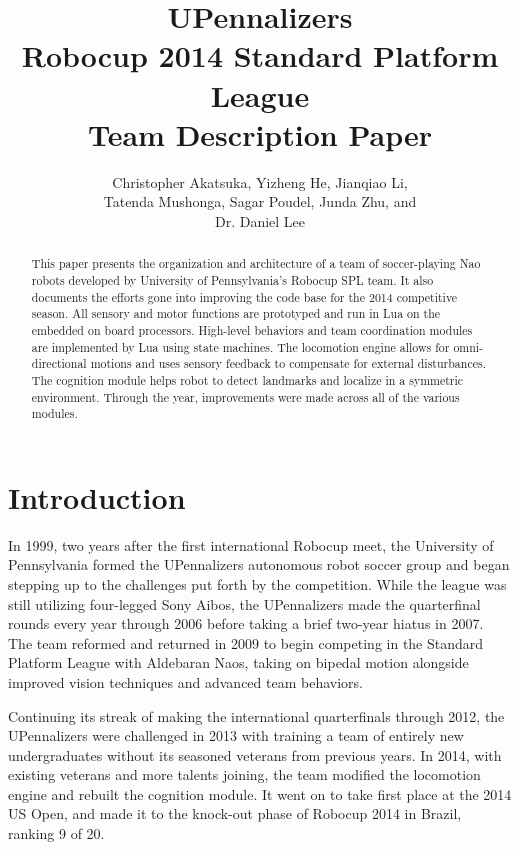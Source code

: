 \documentclass{article}
\title{UPennalizers \\Robocup 2014 Standard Platform League \\Team Description Paper}
\author{Christopher Akatsuka, Yizheng He, Jianqiao Li,\\ Tatenda Mushonga, Sagar Poudel, Junda Zhu, and\\Dr. Daniel Lee}
\affil{General Robotics Automation, Sensing and Perception (GRASP) Laboratory \\University of Pennsylvania}
\date{} %
\begin{document}
\maketitle

\begin{abstract}
 	This paper presents the organization and architecture of a team of soccer-playing Nao robots developed by University of Pennsylvania's Robocup SPL team. It also documents the efforts gone into improving the code base for the 2014 competitive season. All sensory and motor functions are prototyped and run in Lua on the embedded on board processors. High-level behaviors and team coordination modules are implemented by Lua using state machines. The locomotion engine allows for omni-directional motions and uses sensory feedback to compensate for external disturbances. The cognition module helps robot to detect landmarks and localize in a symmetric environment. Through the year, improvements were made across all of the various modules. 
\end{abstract}

\pagebreak



\section{Introduction}
	In 1999, two years after the first international Robocup meet, the University of Pennsylvania formed the UPennalizers autonomous robot soccer group and began stepping up to the challenges put forth by the competition. While the league was still utilizing four-legged Sony Aibos, the UPennalizers made the quarterfinal rounds every year through 2006 before taking a brief two-year hiatus in 2007. The team reformed and returned in 2009 to begin competing in the Standard Platform League with Aldebaran Naos, taking on bipedal motion alongside improved vision techniques and advanced team behaviors. 

	Continuing its streak of making the international quarterfinals through 2012, the UPennalizers were challenged in 2013 with training a team of entirely new undergraduates without its seasoned veterans from previous years. In 2014, with existing veterans and more talents joining, the team modified the locomotion engine and rebuilt the cognition module. It went on to take first place at the 2014 US Open, and made it to the knock-out phase of Robocup 2014 in Brazil, ranking 9 of 20.
\end{document}
